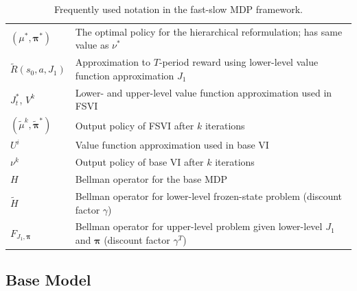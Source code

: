 \documentclass[11pt, notitlepage]{article}
\newcommand{\1}{\mathbbm{1}}
\begin{document}
\begin{table}[hb!]
{\begin{tabular}{@{}ll@{}}
$(\mu^*,\boldsymbol{\pi}^*)$ & The optimal policy for the hierarchical reformulation; has same value as $\nu^*$\\ [0.5em]
$\tilde{R}(s_0,a,J_1)$ & Approximation to $T$-period reward using lower-level value function approximation $J_1$ \\[0.5em] 
$J_t^*$, $V^k$ & Lower- and upper-level value function approximation used in FSVI \\[0.5em] 
$(\tilde{\mu}^k, \tilde{\boldsymbol{\pi}}^*)$ & Output policy of FSVI after $k$ iterations\\ [0.5em]
$U^i$ & Value function approximation used in base VI \\[0.5em] 
$\nu^k$ & Output policy of base VI after $k$ iterations \\ [0.5em]

$H$ & Bellman operator for the base MDP \\ [0.5em]

$\tilde{H}$ & Bellman operator for lower-level frozen-state problem (discount factor $\gamma$) \\ [0.5em]

$F_{J_1, \boldsymbol{\pi}}$ & Bellman operator for  upper-level problem given lower-level $J_1$ and $\boldsymbol{\pi}$ (discount factor $\gamma^T$)\\ [0.5em]

\bottomrule
\end{tabular}
}
\caption{Frequently used notation in the fast-slow MDP framework.}
\label{tab:notation}
\end{table}







\subsection{Base Model}
\end{document}
